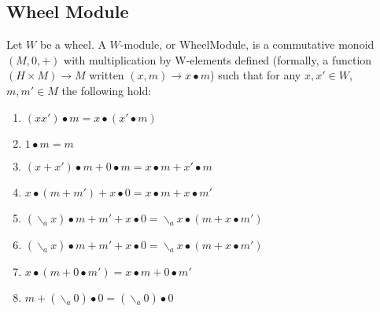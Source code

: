 \subsection{Wheel Module}
\begin{definition}
  \label{def:wheel_module}
  \leanok
  Let $W$ be a wheel. A $W$-module, or WheelModule, is a commutative monoid
  $(M,0,+)$ with multiplication by W-elements defined (formally, a function
  $(H × M) → M$ written $(x,m) → x • m$) such that for any $x,x' ∈ W$, $m,m' ∈ M$
  the following hold:
  \begin{enumerate}
  \item $(xx') • m = x • (x' • m)$ \\
  \item $1 • m = m$ \\
  \item $(x + x') • m + 0 • m  = x • m + x' • m$ \\
  \item $x • (m + m') + x • 0 = x • m + x • m'$ \\
  \item $(\backslash_{a} x) • m + m' + x • 0 = \backslash_{a} x • (m + x • m')$ \\
  \item $(\backslash_{a} x) • m + m' + x • 0 = \backslash_{a} x • (m + x • m')$ \\
  \item $x • (m + 0 • m') = x • m + 0 • m'$ \\
  \item $m + ( \backslash_{a} 0 ) • 0 = ( \backslash_{a} 0 ) • 0$ 
  \end{enumerate}
\end{definition}